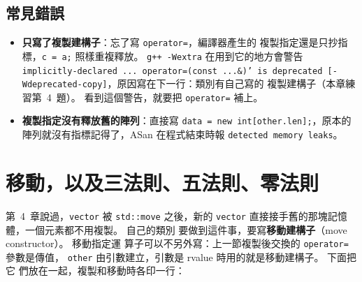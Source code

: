 \subsection{常見錯誤}

\begin{itemize}
\item \textbf{只寫了複製建構子}：忘了寫 \texttt{operator=}，編譯器產生的
複製指定還是只抄指標，\texttt{c = a;} 照樣重複釋放。 \texttt{g++ -Wextra}
在用到它的地方會警告 \texttt{implicitly-declared ... operator=(const
...\&)' is deprecated [-Wdeprecated-copy]}，原因寫在下一行：類別有自己寫的
複製建構子（本章練習第~4~題）。 看到這個警告，就要把 \texttt{operator=}
補上。
\item \textbf{複製指定沒有釋放舊的陣列}：直接寫 \texttt{data = new
int[other.len];}，原本的陣列就沒有指標記得了，ASan 在程式結束時報
\texttt{detected memory leaks}。
\end{itemize}

\section{移動，以及三法則、五法則、零法則}
\label{sec:rule-of-zero}

第~4~章說過，\texttt{vector} 被 \texttt{std::move} 之後，新的
\texttt{vector} 直接接手舊的那塊記憶體，一個元素都不用複製。 自己的類別
要做到這件事，要寫\textbf{移動建構子}（move constructor）。 移動指定運
算子可以不另外寫：上一節複製後交換的 \texttt{operator=} 參數是傳值，
\texttt{other} 由引數建立，引數是 rvalue 時用的就是移動建構子。 下面把它
們放在一起，複製和移動時各印一行：

